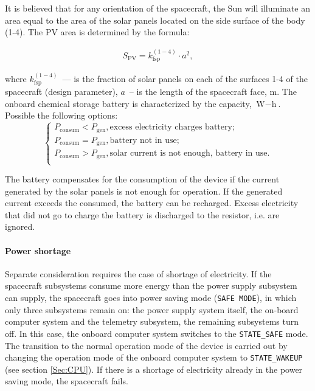 \documentclass[12pt,a4paper]{article}
\begin{document}
It is believed that for any orientation of the spacecraft, the Sun will illuminate an area equal to the area of the solar panels located on the side surface of the body (1-4). The PV area is determined by the formula:

\begin{eqnarray}
   S_{\text{PV}} = k^{(1-4)}_{\text{fsp}} \cdot a^2, \label{Eq:photopanels}
\end{eqnarray}

where $k^{(1-4)}_{\text{fsp}}$~--- is the fraction of solar panels on each of the surfaces 1-4 of the spacecraft (design parameter), $a$~-- is the length of the spacecraft face, m. The onboard chemical storage battery is characterized by the capacity, $\text{W}-\text{h}$. Possible the following options:
$$
  \left\{
   \begin{array}{l}
     P_{\text{consum}} < P_{\text{gen}}, \text{excess electricity charges
       battery};\\
     P_{\text{consum}} = P_{\text{gen}}, \text{battery not in use};\\
     P_{\text{consum}} > P_{\text{gen}}, \text{solar current is not enough,
       battery in use}.\\
   \end{array}
\right.
$$

The battery compensates for the consumption of the device if the current generated by the solar panels is not enough for operation. If the generated current exceeds the consumed, the battery can be recharged. Excess electricity that did not go to charge the battery is discharged to the resistor, i.e. are ignored.

\paragraph{Power shortage}

Separate consideration requires the case of shortage of electricity. If the spacecraft subsystems consume more energy than the power supply subsystem can supply, the spacecraft goes into power saving mode (\verb'SAFE MODE'), in which only three subsystems remain on: the power supply system itself, the on-board computer system and the telemetry subsystem, the remaining subsystems turn off. In this case, the onboard computer system switches to the \verb'STATE_SAFE' mode. The transition to the normal operation mode of the device is carried out by changing the operation mode of the onboard computer system to \verb'STATE_WAKEUP' (see section \ref{Sec:CPU}). If there is a shortage of electricity already in the power saving mode, the spacecraft fails.
\end{document}
